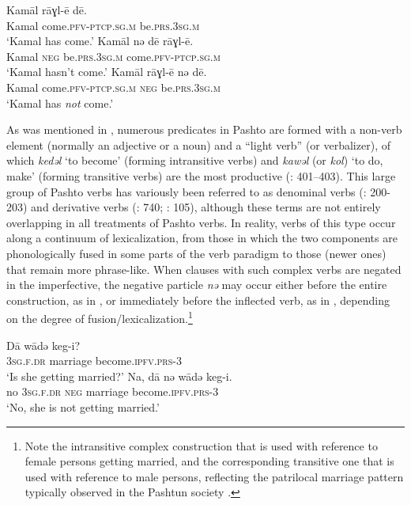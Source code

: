 \documentclass[output=paper,colorlinks,citecolor=brown]{langscibook}
\begin{document}
\ea\label{ex:pas:9}
    \ea\label{ex:pas:9a}
        \gll Kamāl rāɣl-ē dē.\\
             Kamal come.\textsc{pfv-ptcp.sg.m} be.\textsc{prs.3sg.m}\\
        \glt ‘Kamal has come.’
    \ex\label{ex:pas:9b}
        \gll Kamāl nə dē rāɣl-ē. \\
             Kamal \textsc{neg} be.\textsc{prs.3sg.m} come.\textsc{pfv-ptcp.sg.m}\\
        \glt ‘Kamal hasn’t come.’ 
    \ex\label{ex:pas:9c}
        \gll Kamāl rāɣl-ē nə dē. \\
             Kamal come.\textsc{pfv-ptcp.sg.m} \textsc{neg} be.\textsc{prs.3sg.m} \\
        \glt ‘Kamal has \textit{not} come.’
    \z
\z 

As was mentioned in , numerous predicates in Pashto are formed with a non-verb element (normally an adjective or a noun) and a “light verb” (or verbalizer), of which \textit{kedəl} ‘to become’ (forming intransitive verbs) and \textit{kawəl} (or \textit{kol}) ‘to do, make’ (forming transitive verbs) are the most productive (\citealt{BrugmanDavid2014}: 401–403). This large group of Pashto verbs has variously been referred to as denominal verbs (\citealt{DavidGoodman2014}: 200{}-203) and derivative verbs (\citealt{RobsonTegey2009}: 740; \citealt{TegeyRobson1996}: 105), although these terms are not entirely overlapping in all treatments of Pashto verbs. In reality, verbs of this type occur along a continuum of lexicalization, from those in which the two components are phonologically fused in some parts of the verb paradigm to those (newer ones) that remain more phrase-like. When clauses with such complex verbs are negated in the imperfective, the negative particle \textit{nə} may occur either before the entire construction, as in , or immediately before the inflected verb, as in , depending on the degree of fusion/lexicalization.\footnote{Note the intransitive complex construction that is used with reference to female persons getting married, and the corresponding transitive one that is used with reference to male persons, reflecting the patrilocal marriage pattern typically observed in the Pashtun society \citep[52--57]{Grima1993}.}

\ea\label{ex:pas:10}
    \ea\label{ex:pas:10a}
        \gll D\={a}  wādə keg-i?\\
             \textsc{3sg.f.dr} marriage become.\textsc{ipfv.prs{}-3}\\
        \glt ‘Is she getting married?’
    \ex\label{ex:pas:10b}
        \gll Na, dā nə wādə keg-i.\\
             no \textsc{3sg.f.dr} \textsc{neg} marriage become.\textsc{ipfv.prs-3}\\
        \glt ‘No, she is not getting married.’
    \z
\z 
\end{document}
